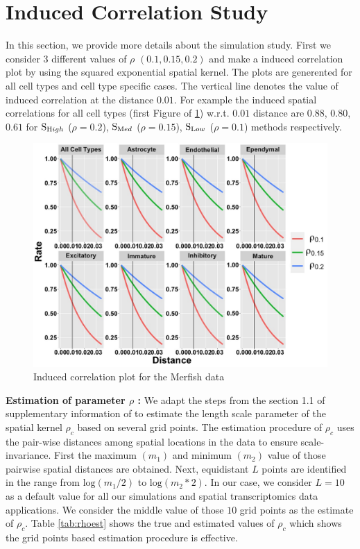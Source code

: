 \documentclass[
]{book}
\begin{document}
\hypertarget{induced-correlation-study}{%
\section{Induced Correlation Study}\label{induced-correlation-study}}

In this section, we provide more details about the simulation study. First we consider \(3\) different values of \(\rho\) \((0.1,0.15,0.2)\) and make a induced correlation plot by using the squared exponential spatial kernel. The plots are generented for all cell types and cell type specific cases. The vertical line denotes the value of induced correlation at the distance \(0.01\). For example the induced spatial correlations for all cell types (first Figure of \ref{fig:induceCORR}) w.r.t. \(0.01\) distance are \(0.88\), \(0.80\), \(0.61\) for \(\text S_{\text High}\) (\(\rho = 0.2\)), \(\text S_{\text Med}\) (\(\rho = 0.15\)), \(\text S_{\text Low}\) (\(\rho = 0.1\)) methods respectively.

\begin{figure}

{\centering \includegraphics[width=0.8\linewidth]{images/Merfish_induced_correlation_final} 

}

\caption{Induced correlation plot for the Merfish data}\label{fig:induceCORR}
\end{figure}

\textbf{Estimation of parameter \(\rho\) :}
We adapt the steps from the section 1.1 of supplementary information of \citet{sun2020statistical} to estimate the length scale parameter of the spatial kernel \(\rho_{c}\) based on several grid points. The estimation procedure of \(\rho_{c}\) uses the pair-wise distances among spatial locations in the data to ensure scale-invariance. First the maximum \((m_{1})\) and minimum \((m_{2})\) value of those pairwise spatial distances are obtained. Next, equidistant \(L\) points are identified in the range from \(\text{log}(m_{1}/2)\) to \(\text{log}(m_{2}*2)\). In our case, we consider \(L=10\) as a default value for all our simulations and spatial transcriptomics data applications. We consider the middle value of those \(10\) grid points as the estimate of \(\rho_{c}\). Table \ref{tab:rhoest} shows the true and estimated values of \(\rho_{c}\) which shows the grid points based estimation procedure is effective.
\end{document}
